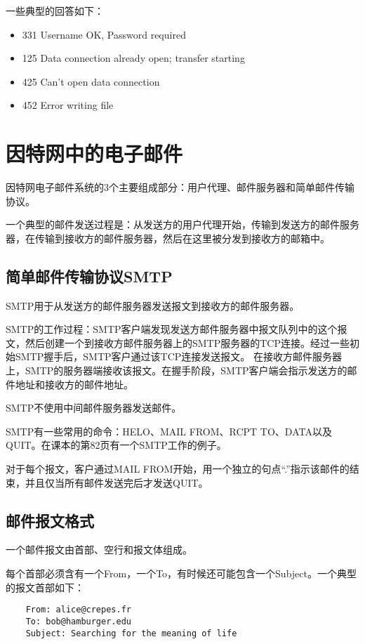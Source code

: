 \documentclass[a4paper,left=2.5cm,right=2.5cm,11pt]{article}
\begin{document}
	一些典型的回答如下：
	\begin{itemize}
		\item 331 Username OK, Password required
		\item 125 Data connection already open; transfer starting
		\item 425 Can't open data connection
		\item 452 Error writing file
	\end{itemize}

\section{因特网中的电子邮件}
	因特网电子邮件系统的3个主要组成部分：用户代理、邮件服务器和简单邮件传输协议。\par

	一个典型的邮件发送过程是：从发送方的用户代理开始，传输到发送方的邮件服务器，在传输到接收方的邮件服务器，然后在这里被分发到接收方的邮箱中。

\subsection{简单邮件传输协议SMTP}
	SMTP用于从发送方的邮件服务器发送报文到接收方的邮件服务器。\par

	SMTP的工作过程：SMTP客户端发现发送方邮件服务器中报文队列中的这个报文，然后创建一个到接收方邮件服务器上的SMTP服务器的TCP连接。经过一些初始SMTP握手后，SMTP客户通过该TCP连接发送报文。
	在接收方邮件服务器上，SMTP的服务器端接收该报文。在握手阶段，SMTP客户端会指示发送方的邮件地址和接收方的邮件地址。\par

	SMTP不使用中间邮件服务器发送邮件。\par

	SMTP有一些常用的命令：HELO、MAIL FROM、RCPT TO、DATA以及QUIT。在课本的第82页有一个SMTP工作的例子。\par

	对于每个报文，客户通过MAIL FROM开始，用一个独立的句点“.”指示该邮件的结束，并且仅当所有邮件发送完后才发送QUIT。

\subsection{邮件报文格式}
	一个邮件报文由首部、空行和报文体组成。\par

	每个首部必须含有一个From，一个To，有时候还可能包含一个Subject。一个典型的报文首部如下：
	\begin{lstlisting}
	From: alice@crepes.fr
	To: bob@hamburger.edu
	Subject: Searching for the meaning of life
	\end{lstlisting}
\end{document}
